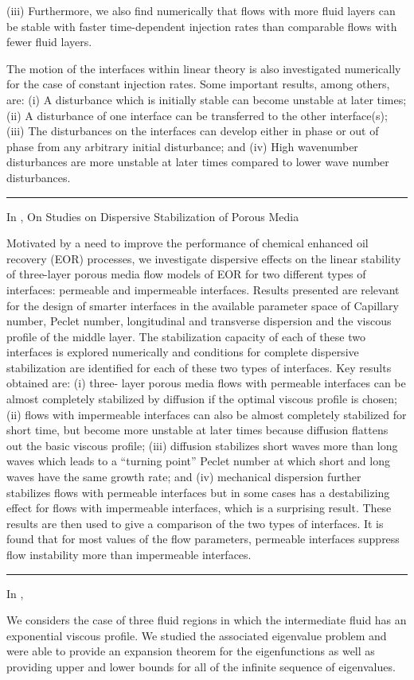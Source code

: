 \documentclass[10pt]{article}
\begin{document}
(iii) Furthermore, we also find numerically that flows with more fluid layers can be stable with faster time-dependent injection rates than comparable flows with fewer fluid layers.

The motion of the interfaces within linear theory is also investigated numerically for the case of constant injection rates. Some important results, among others, are: (i) A disturbance which is initially stable can become unstable at later times; (ii) A disturbance of one interface can be transferred to the other interface(s);  (iii) The disturbances on the interfaces can develop either in phase or out of phase from any arbitrary initial disturbance; and (iv) High wavenumber disturbances are more unstable at later times compared to lower wave number disturbances.
\bigskip\hrule\bigskip

In \cite{gin-daripa:dispersion}, On Studies on Dispersive Stabilization of Porous Media

Motivated by a need to improve the performance of chemical enhanced oil recovery (EOR) processes, we investigate dispersive effects on the linear stability of three-layer porous media flow models of EOR for two different types of interfaces: permeable and impermeable interfaces. Results presented are relevant for the design of smarter interfaces in the available parameter space of Capillary number, Peclet number, longitudinal and transverse dispersion and the viscous profile of the middle layer.  The stabilization capacity of each of these two interfaces is explored numerically and conditions for complete dispersive stabilization are identified for each of these two types of interfaces. Key results obtained are: (i) three- layer porous media flows with permeable interfaces can be almost completely stabilized by diffusion if the optimal viscous profile is chosen; (ii) flows with impermeable interfaces can also be almost completely stabilized for short time, but become more unstable at later times because diffusion flattens out the basic viscous profile; (iii) diffusion stabilizes short waves more than long waves which leads to a “turning point” Peclet number at which short and long waves have the same growth rate; and (iv) mechanical dispersion further stabilizes flows with permeable interfaces but in some cases has a destabilizing effect for flows with impermeable interfaces, which is a surprising result. These results are then used to give a comparison of the two types of interfaces. It is found that for most values of the flow parameters, permeable interfaces suppress flow instability more than impermeable interfaces.
\bigskip\hrule\bigskip

In \cite{gin-daripa:hs-rect},

We considers the case of three fluid regions in which the intermediate fluid has an exponential viscous profile. We studied the associated eigenvalue problem and were able to provide an expansion theorem for the eigenfunctions as well as providing upper and lower bounds for all of the infinite sequence of eigenvalues.




\end{document}
